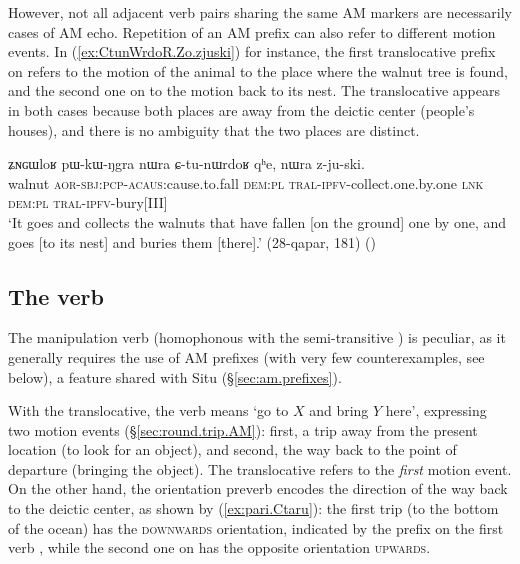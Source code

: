 However, not all adjacent verb pairs sharing the same AM markers are necessarily cases of AM echo. Repetition of an AM prefix can also refer to different motion events. In (\ref{ex:CtunWrdoR.Zo.zjuski}) for instance, the first translocative prefix on  refers to the motion of the animal to the place where the walnut tree is found, and the second one on  to the motion back to its nest. The translocative appears in both cases because both places are away from the deictic center (people's houses), and there is no ambiguity that the two places are distinct.

\begin{exe}
\ex \label{ex:CtunWrdoR.Zo.zjuski}
\gll   ʑɴɢɯloʁ pɯ-kɯ-ŋgra nɯra ɕ-tu-nɯrdoʁ qʰe, nɯra z-ju-ski. \\
walnut \textsc{aor}-\textsc{sbj}:\textsc{pcp}-\textsc{acaus}:cause.to.fall \textsc{dem}:\textsc{pl}
\textsc{tral}-\textsc{ipfv}-collect.one.by.one \textsc{lnk} \textsc{dem}:\textsc{pl} \textsc{tral}-\textsc{ipfv}-bury[III] \\
\glt `It goes and collects the walnuts that have fallen [on the ground] one by one, and goes [to its nest] and buries them [there].' (28-qapar, 181) ()
\end{exe}

\subsection{The verb } \label{sec:ru.fetch}
The manipulation verb  (homophonous with the semi-transitive ) is peculiar, as it generally requires the use of AM prefixes (with very few counterexamples, see below), a feature shared with Situ (§\ref{sec:am.prefixes}). 

With the translocative, the verb  means `go to $X$ and bring $Y$ here',  expressing two motion events (§\ref{sec:round.trip.AM}): first, a trip away from the present location (to look for an object), and second, the way back to the point of departure (bringing the object). The translocative refers to the \textit{first} motion event.  On the other hand, the orientation preverb encodes the direction of the way back to the deictic center, as shown by (\ref{ex:pari.Ctaru}): the first trip (to the bottom of the ocean) has the \textsc{downwards} orientation, indicated by the prefix on the first verb , while the second one on  has the opposite orientation \textsc{upwards}.

